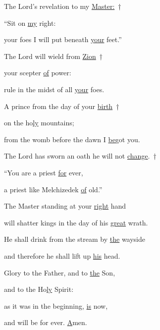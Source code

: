 
\noindent The Lord’s revelation to my \uline{Master:}~†~\nopagebreak

“Sit on \uline{my} right:~\GreStar{}~\nopagebreak

your foes I will put beneath \uline{your} feet.”

\noindent The Lord will wield from \uline{Zion}~†~\nopagebreak

your scepter \uline{of} power:~\GreStar{}~\nopagebreak

rule in the midst of all \uline{your} foes.

\noindent A prince from the day of your \uline{birth}~†~\nopagebreak

on the ho\uline{ly} mountains;~\GreStar{}~\nopagebreak

from the womb before the dawn I \uline{be}got you.

\noindent The Lord has sworn an oath he will not \uline{change}.~†~\nopagebreak

“You are a priest \uline{for} ever,~\GreStar{}~\nopagebreak

a priest like Melchizedek \uline{of} old.”

\noindent The Master standing at your \uline{right} hand~\GreStar{}~\nopagebreak

will shatter kings in the day of his \uline{great} wrath.

\noindent He shall drink from the stream by \uline{the} wayside~\GreStar{}~\nopagebreak

and therefore he shall lift up \uline{his} head.

\noindent Glory to the Father, and to \uline{the} Son,~\GreStar{}~\nopagebreak

and to the Ho\uline{ly} Spirit:

\noindent as it was in the beginning, \uline{is} now,~\GreStar{}~\nopagebreak

and will be for ever. \uline{A}men.
